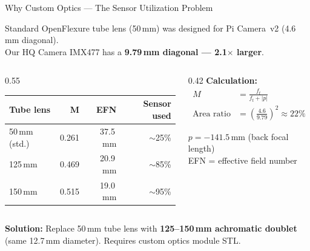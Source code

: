 \documentclass[aspectratio=169,11pt]{beamer}
\begin{document}
\begin{frame}{Why Custom Optics --- The Sensor Utilization Problem}

  Standard OpenFlexure tube lens (50\,mm) was designed for Pi Camera~v2 (4.6\,mm diagonal).\\
  Our HQ Camera IMX477 has a \textbf{9.79\,mm diagonal --- 2.1$\times$ larger}.

  \vspace{0.5em}

  \begin{columns}[T]
    \begin{column}{0.55\textwidth}
      \begin{tabular}{@{}lrrr@{}}
        \toprule
        \textbf{Tube lens} & \textbf{M} & \textbf{EFN} & \textbf{Sensor used} \\
        \midrule
        50\,mm (std.)   & 0.261 & 37.5\,mm & \alert{$\sim$25\%} \\
        125\,mm         & 0.469 & 20.9\,mm & $\sim$85\% \\
        150\,mm         & 0.515 & 19.0\,mm & $\sim$95\% \\
        \bottomrule
      \end{tabular}
    \end{column}

    \begin{column}{0.42\textwidth}
      \small
      \textbf{Calculation:}
      \begin{align*}
        M &= \frac{f_t}{f_t + |p|} \\[0.3em]
        \text{Area ratio} &= \left(\frac{4.6}{9.79}\right)^2 \approx 22\%
      \end{align*}

      \vspace{0.3em}
      $p = -141.5$\,mm (back focal length)\\
      EFN = effective field number
    \end{column}
  \end{columns}

  \vfill
  \textbf{Solution:} Replace 50\,mm tube lens with \textbf{125--150\,mm achromatic doublet} (same 12.7\,mm diameter). Requires custom optics module STL.

\end{frame}
\end{document}
